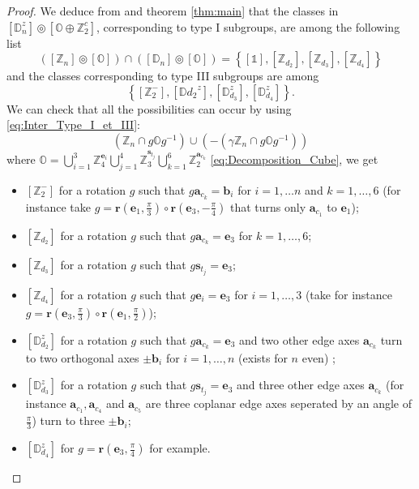 \documentclass[11pt,a4paper]{amsart}
\theoremstyle{definition}
\newcommand{\ZZ}{\mathbb{Z}}                %
\newcommand{\octa}{\mathbb{O}}              %
\newcommand{\DD}{\mathbb{D}}                %
\newcommand{\1}{\mathds{1}}		            %
\newcommand{\ee}{\pmb{e}}                   %
\newcommand{\vR}{\mathbf{r}}
\newcommand{\bb}{\mathbf{b}}
\newcommand{\set}[1]{\left\{#1\right\}}     %
\begin{document}
	
	\begin{proof}
		We deduce from \cite[table 1]{Olive2019} and theorem \ref{thm:main} that the classes in $[\DD_n^z]\circledcirc [\octa\oplus \ZZ_2^c]$, corresponding to type I subgroups, are among the following list
		\begin{equation*}
		([\ZZ_n]\circledcirc [\octa])\cap ([\DD_n]\circledcirc[\octa])=\set{[\1],[\ZZ_{d_2}],[\ZZ_{d_3}],[\ZZ_{d_4}]}
		\end{equation*}
		and the classes corresponding to type III subgroups are among
		\begin{equation*}
		\set{[\ZZ_2^-],[\DD{d_2}^z] ,[\DD_{d_3}^z],[\DD_{d_4}^z]}.
		\end{equation*}
		We can check that all the possibilities can occur by using \eqref{eq:Inter_Type_I_et_III}:
		\begin{equation*}
		(\ZZ_n\cap g \octa g^{-1})\cup (-(\gamma\ZZ_n\cap g \octa g^{-1}))
		\end{equation*}
		where $\octa=\bigcup_{i=1}^3 \ZZ_4^{\ee_i}\bigcup_{j=1}^4 \ZZ_3^{\pmb{s}_{t_j}}\bigcup_{k=1}^6\ZZ_2^{\pmb{a}_{c_k}}$ \eqref{eq:Decomposition_Cube},
		we get
		\begin{itemize}
			
			\item $[\ZZ_2^-]$ for a rotation $g$ such that $g\pmb{a}_{c_k}=\bb_i$ for $ i=1,\dotsc n$ and $k=1,\dotsc,6$ (for instance take $g=\vR\left(\ee_1,\frac{\pi}{3}\right)\circ \vR\left(\ee_3,-\frac{\pi}{4}\right)$ that turns only $\pmb{a}_{c_1}$ to $\ee_1$);
			\item $[\ZZ_{d_2}]$ for a rotation $g$ such that $g\pmb{a}_{c_k}= \ee_3$ for $k=1,\dotsc,6$;
			\item $[\ZZ_{d_3}]$ for a rotation $g$ such that $g\pmb{s}_{t_j}= \ee_3$;
			\item $[\ZZ_{d_4}]$ for a rotation $g$ such that $g\ee_i= \ee_3$ for $i=1,\dotsc,3$ (take for instance $g=\vR\left(\ee_3,\frac{\pi}{3}\right)\circ\vR\left(\ee_1,\frac{\pi}{2}\right)$);
		    \item $[\DD_{d_2}^z]$ for a rotation $g$ such that $g\pmb{a}_{c_k}= \ee_3$ and two other edge axes $\pmb{a}_{c_k}$  turn to two orthogonal axes $\pm \bb_i$ for $i=1,\dotsc,n$ (exists for $n$ even) ;	   
		    \item $[\DD_{d_3}^z]$ for a rotation $g$ such that $g\pmb{s}_{t_j}= \ee_3$ and three other edge axes $\pmb{a}_{c_k}$ (for instance $\pmb{a}_{c_1},\pmb{a}_{c_4}$ and $\pmb{a}_{c_5}$ are three coplanar edge axes seperated by an angle of $\frac{\pi}{3}$) turn to three $\pm \bb_i$;
		    \item $[\DD_{d_4}^z]$ for $g=\vR\left(\ee_3,\frac{\pi}{4}\right)$ for example.
		\end{itemize}
	\end{proof}
	
\end{document}
